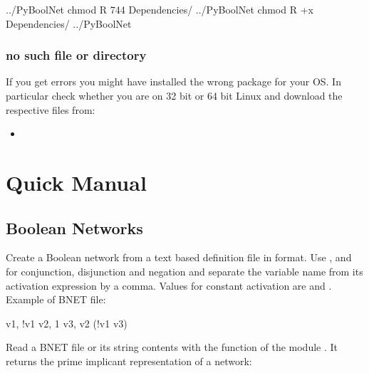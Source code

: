 \documentclass[letterpaper,10pt,english]{sphinxmanual}
\begin{document}
\begin{sphinxVerbatim}[commandchars=\\\{\}]
../PyBoolNet\PYGZdl{} chmod \PYGZhy{}R 744 Dependencies/
../PyBoolNet\PYGZdl{} chmod \PYGZhy{}R +x Dependencies/
../PyBoolNet\PYGZdl{}
\end{sphinxVerbatim}


\subsection{no such file or directory}
\label{\detokenize{Installation:no-such-file-or-directory}}
If you get  errors you might have installed the wrong package for your OS. In particular check whether you are on 32 bit or 64 bit Linux and download the respective files from:
\begin{itemize}
\item {} 

\end{itemize}


\chapter{Quick Manual}
\label{\detokenize{ManualQuick:quick-manual}}\label{\detokenize{ManualQuick:networkx-has-path}}\label{\detokenize{ManualQuick::doc}}

\section{Boolean Networks}
\label{\detokenize{ManualQuick:boolean-networks}}
Create a Boolean network from a text based definition file in  format.
Use \sphinxcode{\&}, \sphinxcode{\textbar{}} and \sphinxcode{!} for conjunction, disjunction and negation and separate the variable name from its activation expression by a comma.
Values for constant activation are  and .
Example of BNET file:

\begin{sphinxVerbatim}[commandchars=\\\{\}]
v1,     !v1
v2,     1
v3,     v2 \PYGZam{} (!v1 \textbar{} v3)
\end{sphinxVerbatim}

Read a BNET file or its string contents with the function {\hyperref[\detokenize{FileExchange:bnet2primes}]{}} of the module {\hyperref[\detokenize{FileExchange:fileexchange}]{}}.
It returns the prime implicant representation of a network:
\end{document}
